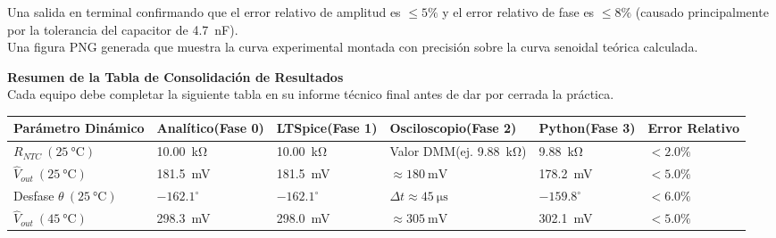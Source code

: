 \documentclass[11pt,a4paper]{article}
\begin{document}
\begin{resultado}
Una salida en terminal confirmando que el error relativo de amplitud es $\le 5\%$ y el error relativo de fase es $\le 8\%$ (causado principalmente por la tolerancia del capacitor de \qty{4.7}{\nano\farad}).\\
Una figura PNG generada que muestra la curva experimental montada con precisión sobre la curva senoidal teórica calculada.
\end{resultado}

\vspace{0.5cm}
\begin{info}
\textbf{Resumen de la Tabla de Consolidación de Resultados}\\
Cada equipo debe completar la siguiente tabla en su informe técnico final antes de dar por cerrada la práctica.
\end{info}

\begin{table}[h!]
    \centering
    \small %
    \renewcommand{\arraystretch}{1.5} %
    \begin{tabularx}{\textwidth}{|>{\raggedright\arraybackslash}p{2.8cm}|>{\centering\arraybackslash}X|>{\centering\arraybackslash}X|>{\centering\arraybackslash}X|>{\centering\arraybackslash}X|>{\centering\arraybackslash}X|}
        \hline
        \textbf{Parámetro Dinámico} & \textbf{Analítico}\newline (Fase 0) & \textbf{LTSpice}\newline (Fase 1) & \textbf{Osciloscopio}\newline (Fase 2) & \textbf{Python}\newline (Fase 3) & \textbf{Error Relativo} \\
        \hline
        $R_{NTC}\ (\qty{25}{\celsius})$ & \qty{10.00}{\kilo\ohm} & \qty{10.00}{\kilo\ohm} & Valor DMM\newline (ej. \qty{9.88}{\kilo\ohm}) & \qty{9.88}{\kilo\ohm} & $< 2.0\%$ \\
        \hline
        $\hat{V}_{out}\ (\qty{25}{\celsius})$ & \qty{181.5}{\milli\volt} & \qty{181.5}{\milli\volt} & $\approx \qty{180}{\milli\volt}$ & \qty{178.2}{\milli\volt} & $< 5.0\%$ \\
        \hline
        Desfase $\theta\ (\qty{25}{\celsius})$ & $-162.1^\circ$ & $-162.1^\circ$ & $\Delta t \approx \qty{45}{\micro\second}$ & $-159.8^\circ$ & $< 6.0\%$ \\
        \hline
        $\hat{V}_{out}\ (\qty{45}{\celsius})$ & \qty{298.3}{\milli\volt} & \qty{298.0}{\milli\volt} & $\approx \qty{305}{\milli\volt}$ & \qty{302.1}{\milli\volt} & $< 5.0\%$ \\
        \hline
    \end{tabularx}
\end{table}
\end{document}

